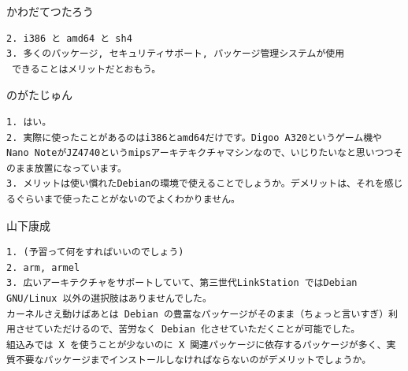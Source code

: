 \documentclass[mingoth,a4paper]{jsarticle}
\begin{document}
\begin{prework}{ かわだてつたろう }

\begin{verbatim}
2. i386 と amd64 と sh4
3. 多くのパッケージ, セキュリティサポート, パッケージ管理システムが使用
 できることはメリットだとおもう。
\end{verbatim}

\end{prework}



\begin{prework}{ のがたじゅん }

\begin{verbatim}
1. はい。
2. 実際に使ったことがあるのはi386とamd64だけです。Digoo A320というゲーム機やNano NoteがJZ4740というmipsアーキテキクチャマシンなので、いじりたいなと思いつつそのまま放置になっています。
3. メリットは使い慣れたDebianの環境で使えることでしょうか。デメリットは、それを感じるぐらいまで使ったことがないのでよくわかりません。
\end{verbatim}

\end{prework}



\begin{prework}{ 山下康成 }

\begin{verbatim}
1. (予習って何をすればいいのでしょう)
2. arm, armel
3. 広いアーキテクチャをサポートしていて、第三世代LinkStation ではDebian GNU/Linux 以外の選択肢はありませんでした。
カーネルさえ動けばあとは Debian の豊富なパッケージがそのまま（ちょっと言いすぎ）利用させていただけるので、苦労なく Debian 化させていただくことが可能でした。
組込みでは X を使うことが少ないのに X 関連パッケージに依存するパッケージが多く、実質不要なパッケージまでインストールしなければならないのがデメリットでしょうか。
\end{verbatim}

\end{prework}
\end{document}
